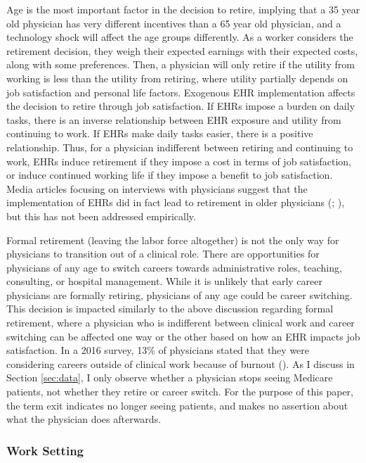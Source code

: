\documentclass[12pt]{article}
\begin{document}
Age is the most important factor in the decision to retire, implying that a 35 year old physician has very different incentives than a 65 year old physician, and a technology shock will affect the age groups differently. As a worker considers the retirement decision, they weigh their expected earnings with their expected costs, along with some preferences. Then, a physician will only retire if the utility from working is less than the utility from retiring, where utility partially depends on job satisfaction and personal life factors. Exogenous EHR implementation affects the decision to retire through job satisfaction. If EHRs impose a burden on daily tasks, there is an inverse relationship between EHR exposure and utility from continuing to work. If EHRs make daily tasks easier, there is a positive relationship. Thus, for a physician indifferent between retiring and continuing to work, EHRs induce retirement if they impose a cost in terms of job satisfaction, or induce continued working life if they impose a benefit to job satisfaction. Media articles focusing on interviews with physicians suggest that the implementation of EHRs did in fact lead to retirement in older physicians (\cite{ringel_2019}; \cite{loria_2020}), but this has not been addressed empirically. 

Formal retirement (leaving the labor force altogether) is not the only way for physicians to transition out of a clinical role. There are opportunities for physicians of any age to switch careers towards administrative roles, teaching, consulting, or hospital management. While it is unlikely that early career physicians are formally retiring, physicians of any age could be career switching. This decision is impacted similarly to the above discussion regarding formal retirement, where a physician who is indifferent between clinical work and career switching can be affected one way or the other based on how an EHR impacts job satisfaction. In a 2016 survey, 13\% of physicians stated that they were considering careers outside of clinical work because of burnout (\cite{physicians2016physicians}). As I discuss in Section \ref{sec:data}, I only observe whether a physician stops seeing Medicare patients, not whether they retire or career switch. For the purpose of this paper, the term exit indicates no longer seeing patients, and makes no assertion about what the physician does afterwards.



\subsubsection{Work Setting}
\end{document}
